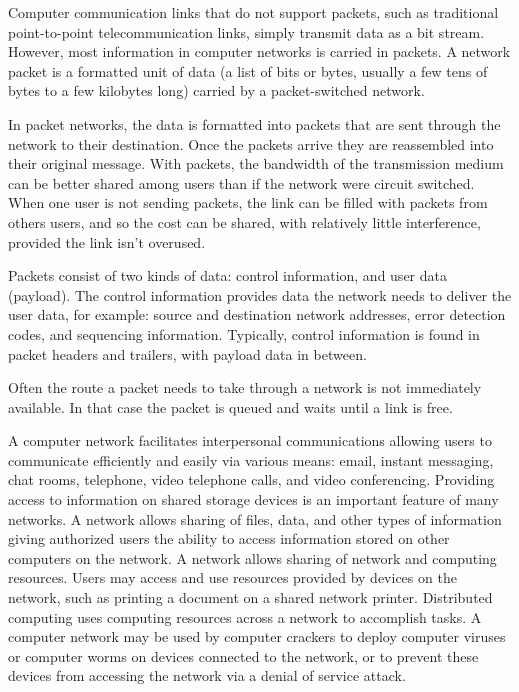 \documentclass[a4paper]{article}
\begin{document}
\begin{enumerate}[label={\textbf{\Roman*.}},leftmargin=0pt,itemindent=*]
    Computer communication links that do not support packets, such as
    traditional point-to-point telecommunication links, simply transmit data as
    a bit stream. However, most information in computer networks is carried in
    packets. A network packet is a formatted unit of data (a list of bits or
    bytes, usually a few tens of bytes to a few kilobytes long) carried by a
    packet-switched network.

    In packet networks, the data is formatted into packets that are sent through
    the network to their destination. Once the packets arrive they are
    reassembled into their original message. With packets, the bandwidth of the
    transmission medium can be better shared among users than if the network
    were circuit switched. When one user is not sending packets, the link can be
    filled with packets from others users, and so the cost can be shared, with
    relatively little interference, provided the link isn't overused.

    Packets consist of two kinds of data: control information, and user data
    (payload). The control information provides data the network needs to
    deliver the user data, for example: source and destination network
    addresses, error detection codes, and sequencing information. Typically,
    control information is found in packet headers and trailers, with payload
    data in between.

    Often the route a packet needs to take through a network is not immediately
    available. In that case the packet is queued and waits until a link is free.

    A computer network facilitates interpersonal communications allowing users
    to communicate efficiently and easily via various means: email, instant
    messaging, chat rooms, telephone, video telephone calls, and video
    conferencing. Providing access to information on shared storage devices is
    an important feature of many networks. A network allows sharing of files,
    data, and other types of information giving authorized users the ability to
    access information stored on other computers on the network. A network
    allows sharing of network and computing resources. Users may access and use
    resources provided by devices on the network, such as printing a document on
    a shared network printer. Distributed computing uses computing resources
    across a network to accomplish tasks. A computer network may be used by
    computer crackers to deploy computer viruses or computer worms on devices
    connected to the network, or to prevent these devices from accessing the
    network via a denial of service attack.


\end{enumerate}
\end{document}
